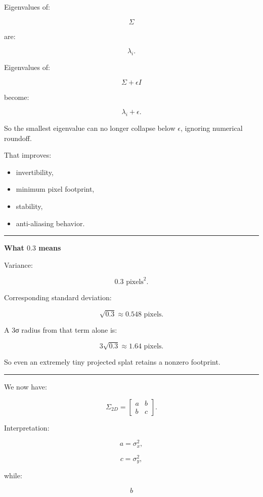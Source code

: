 Eigenvalues of:

\[
\Sigma
\]

are:

\[
\lambda_i.
\]

Eigenvalues of:

\[
\Sigma+\epsilon I
\]

become:

\[
\lambda_i+\epsilon.
\]

So the smallest eigenvalue can no longer collapse below \(\epsilon\), ignoring numerical roundoff.

That improves:

\begin{itemize}
\tightlist
\item
  invertibility,
\item
  minimum pixel footprint,
\item
  stability,
\item
  anti-aliasing behavior.
\end{itemize}

\begin{center}\rule{0.5\linewidth}{0.5pt}\end{center}

\textbf{What \(0.3\) means}

Variance:

\[
0.3\text{ pixels}^2.
\]

Corresponding standard deviation:

\[
\sqrt{0.3}
\approx0.548\text{ pixels}.
\]

A 3σ radius from that term alone is:

\[
3\sqrt{0.3}
\approx1.64\text{ pixels}.
\]

So even an extremely tiny projected splat retains a nonzero footprint.

\begin{center}\rule{0.5\linewidth}{0.5pt}\end{center}

We now have:

\[
\boxed{
\Sigma_{2D}
=
\begin{bmatrix}
a&b\\
b&c
\end{bmatrix}.
}
\]

Interpretation:

\[
a=\sigma_x^2,
\]

\[
c=\sigma_y^2,
\]

while:

\[
b
\]

